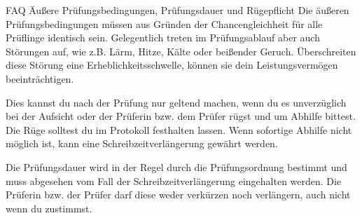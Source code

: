\begin{artikel}{FAQ Äußere Prüfungsbedingungen, Prüfungsdauer und Rügepflicht}
Die äußeren Prüfungsbedingungen müssen aus Gründen der Chancengleichheit für alle Prüflinge identisch sein. Gelegentlich treten im Prüfungsablauf aber auch Störungen auf, wie z.B. Lärm, Hitze, Kälte oder beißender Geruch. Überschreiten diese Störung eine Erheblichkeitsschwelle, können sie dein Leistungsvermögen beeinträchtigen.

Dies kannst du nach der Prüfung nur geltend machen, wenn du es unverzüglich bei der Aufsicht oder der Prüferin bzw. dem Prüfer rügst und um Abhilfe bittest. Die Rüge solltest du im Protokoll festhalten lassen. Wenn sofortige Abhilfe nicht möglich ist, kann eine Schreibzeitverlängerung gewährt werden.

Die Prüfungsdauer wird in der Regel durch die Prüfungsordnung bestimmt und muss abgesehen vom Fall der Schreibzeitverlängerung eingehalten werden. Die Prüferin bzw. der Prüfer darf diese weder verkürzen noch verlängern, auch nicht wenn du zustimmst.
\end{artikel}
